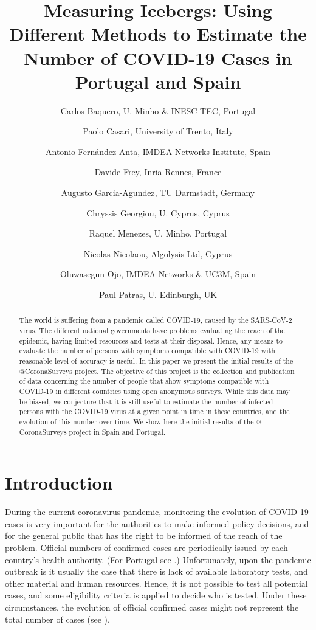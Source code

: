 \documentclass{article}
\begin{document}
\title{Measuring Icebergs: Using Different Methods to Estimate the Number of COVID-19 Cases in Portugal and Spain}
\author{Carlos Baquero, U. Minho \& INESC TEC, Portugal \and
Paolo Casari, University of Trento, Italy \and
Antonio Fernández Anta, IMDEA Networks Institute, Spain \and
Davide Frey, Inria Rennes, France \and
Augusto Garcia-Agundez, TU Darmstadt, Germany \and
Chryssis Georgiou, U. Cyprus, Cyprus \and
Raquel Menezes, U. Minho, Portugal \and
Nicolas Nicolaou, Algolysis Ltd, Cyprus \and
Oluwasegun Ojo, IMDEA Networks \& UC3M, Spain \and
Paul Patras, U. Edinburgh, UK
}
\date{}
\maketitle

\begin{abstract}
The world is suffering from a pandemic called COVID-19, caused by the SARS-CoV-2 virus. The different national governments have problems evaluating the reach of the epidemic, having limited resources and tests at their disposal. Hence, any means to evaluate the number of persons with symptoms compatible with COVID-19 with reasonable level of accuracy is useful. In this paper we present the initial results of the $@$CoronaSurveys project. The objective of this project is the collection and publication of data concerning the number of people that show symptoms compatible with COVID-19 in different countries using open anonymous surveys. While this data may be biased, we conjecture that it is still useful to estimate the number of infected persons with the COVID-19 virus at a given point in time in these countries, and the evolution of this number over time. We show here the initial results of the $@$CoronaSurveys project in Spain and Portugal. 
\end{abstract}

\section{Introduction}

During the current coronavirus pandemic, monitoring the evolution of COVID-19 cases is very important for the authorities to make
informed policy decisions, and for the general public that has the right to be informed of the reach of the problem. 
Official numbers of confirmed cases are periodically issued by each country's health authority. (For Portugal see \cite{DGS}.)
Unfortunately, upon the pandemic outbreak is it usually the case that there is lack of available laboratory tests, and other material and human resources. Hence, it is not possible to test all potential cases, and some eligibility criteria is applied to decide who is tested.
Under these circumstances, the evolution of official confirmed cases might not represent the total number of cases (see \cite{maxmen2020much}).  
\end{document}
